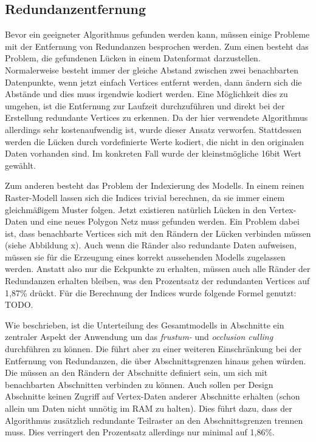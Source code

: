 
\subsection{Redundanzentfernung}\label{redundanzberechnung}
Bevor ein geeigneter Algorithmus gefunden werden kann, müssen einige Probleme mit der Entfernung von Redundanzen besprochen werden. Zum einen besteht das Problem, die gefundenen Lücken in einem Datenformat darzustellen. Normalerweise besteht immer der gleiche Abstand zwischen zwei benachbarten Datenpunkte, wenn jetzt einfach Vertices entfernt werden, dann ändern sich die Abstände und dies muss irgendwie kodiert werden. Eine Möglichkeit dies zu umgehen, ist die Entfernung zur Laufzeit durchzuführen und direkt bei der Erstellung redundante Vertices zu erkennen. Da der hier verwendete Algorithmus allerdings sehr kostenaufwendig ist, wurde dieser Ansatz verworfen. Stattdessen werden die Lücken durch vordefinierte Werte kodiert, die nicht in den originalen Daten vorhanden sind. Im konkreten Fall wurde der kleinstmögliche 16bit Wert gewählt.

Zum anderen besteht das Problem der Indexierung des Modells. In einem reinen Raster-Modell lassen sich die Indices trivial berechnen, da sie immer einem gleichmäßigem Muster folgen. Jetzt existieren natürlich Lücken in den Vertex-Daten und eine neues Polygon Netz muss gefunden werden. Ein Problem dabei ist, dass benachbarte Vertices sich mit den Rändern der Lücken verbinden müssen (siehe Abbildung x). Auch wenn die Ränder also redundante Daten aufweisen, müssen sie für die Erzeugung eines korrekt aussehenden Modells zugelassen werden. Anstatt also nur die Eckpunkte zu erhalten, müssen auch alle Ränder der Redundanzen erhalten bleiben, was den Prozentsatz der redundanten Vertices auf 1,87\% drückt. Für die Berechnung der Indices wurde folgende Formel genutzt: TODO.

Wie beschrieben, ist die Unterteilung des Gesamtmodells in Abschnitte ein zentraler Aspekt der Anwendung um das \textit{frustum-} und \textit{occlusion culling} durchführen zu können. Die führt aber zu einer weiteren Einschränkung bei der Entfernung von Redundanzen, die über Abschnittsgrenzen hinaus gehen würden. Die müssen an den Rändern der Abschnitte definiert sein, um sich mit benachbarten Abschnitten verbinden zu können. Auch sollen per Design Abschnitte keinen Zugriff auf Vertex-Daten anderer Abschnitte erhalten (schon allein um Daten nicht unnötig im RAM zu halten). Dies führt dazu, dass der Algorithmus zusätzlich redundante Teilraster an den Abschnittsgrenzen trennen muss. Dies verringert den Prozentsatz allerdings nur minimal auf 1,86\%.

